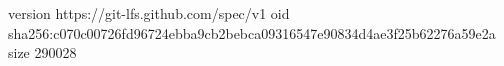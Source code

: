 version https://git-lfs.github.com/spec/v1
oid sha256:c070c00726fd96724ebba9cb2bebca09316547e90834d4ae3f25b62276a59e2a
size 290028
